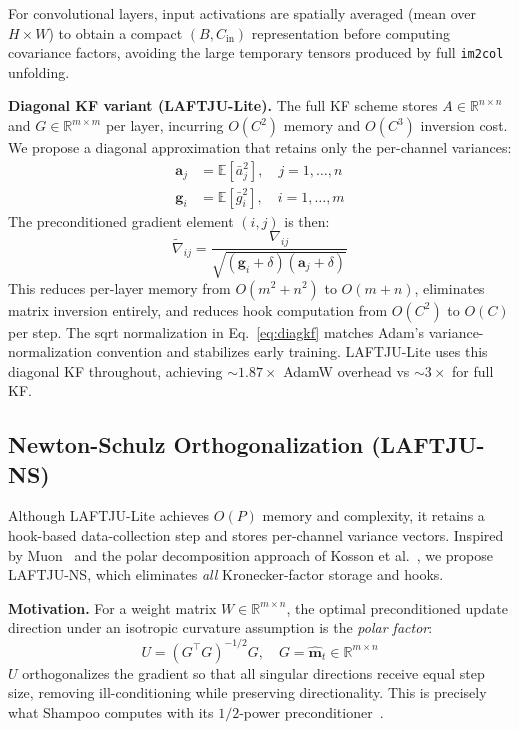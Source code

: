 \documentclass[10pt,twocolumn]{article}
\newcommand{\method}{LAFTJU}
\newcommand{\R}{\mathbb{R}}
\newcommand{\E}{\mathbb{E}}
\begin{document}
For convolutional layers, input activations are spatially averaged (mean over $H \times W$) to obtain a compact $(B, C_{\text{in}})$ representation before computing covariance factors, avoiding the large temporary tensors produced by full \texttt{im2col} unfolding.

\textbf{Diagonal KF variant (\method{}-Lite).} The full KF scheme stores $A \in \R^{n\times n}$ and $G \in \R^{m\times m}$ per layer, incurring $O(C^2)$ memory and $O(C^3)$ inversion cost. We propose a diagonal approximation that retains only the per-channel variances:
\begin{align}
\mathbf{a}_j &= \E[\bar{a}_j^2], \quad j = 1,\ldots,n \\
\mathbf{g}_i &= \E[\bar{g}_i^2], \quad i = 1,\ldots,m
\end{align}
The preconditioned gradient element $(i,j)$ is then:
\begin{equation}
\tilde{\nabla}_{ij} = \frac{\nabla_{ij}}{\sqrt{(\mathbf{g}_i + \delta)(\mathbf{a}_j + \delta)}}
\label{eq:diagkf}
\end{equation}
This reduces per-layer memory from $O(m^2 + n^2)$ to $O(m+n)$, eliminates matrix inversion entirely, and reduces hook computation from $O(C^2)$ to $O(C)$ per step. The sqrt normalization in Eq.~\eqref{eq:diagkf} matches Adam's variance-normalization convention and stabilizes early training. \method{}-Lite uses this diagonal KF throughout, achieving $\sim\!1.87\times$ AdamW overhead vs $\sim\!3\times$ for full KF.

\subsection{Newton-Schulz Orthogonalization (\method{}-NS)}
\label{sec:ns}

Although \method{}-Lite achieves $O(P)$ memory and complexity, it retains a hook-based data-collection step and stores per-channel variance vectors. Inspired by Muon~\cite{muon} and the polar decomposition approach of Kosson et al.~\cite{kosson}, we propose \method{}-NS, which eliminates \emph{all} Kronecker-factor storage and hooks.

\textbf{Motivation.} For a weight matrix $W \in \R^{m \times n}$, the optimal preconditioned update direction under an isotropic curvature assumption is the \emph{polar factor}:
\begin{equation}
U = (G^\top G)^{-1/2} G, \quad G = \hat{\mathbf{m}}_t \in \R^{m \times n}
\label{eq:polar}
\end{equation}
$U$ orthogonalizes the gradient so that all singular directions receive equal step size, removing ill-conditioning while preserving directionality. This is precisely what Shampoo computes with its $1/2$-power preconditioner~\cite{soap}.
\end{document}
